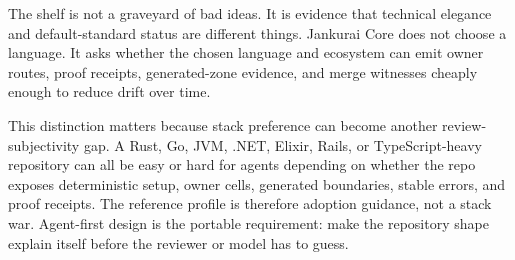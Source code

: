 The shelf is not a graveyard of bad ideas. It is evidence that technical elegance and default-standard status are different things. Jankurai Core does not choose a language. It asks whether the chosen language and ecosystem can emit owner routes, proof receipts, generated-zone evidence, and merge witnesses cheaply enough to reduce drift over time.

This distinction matters because stack preference can become another review-subjectivity gap. A Rust, Go, JVM, .NET, Elixir, Rails, or TypeScript-heavy repository can all be easy or hard for agents depending on whether the repo exposes deterministic setup, owner cells, generated boundaries, stable errors, and proof receipts. The reference profile is therefore adoption guidance, not a stack war. Agent-first design is the portable requirement: make the repository shape explain itself before the reviewer or model has to guess.
